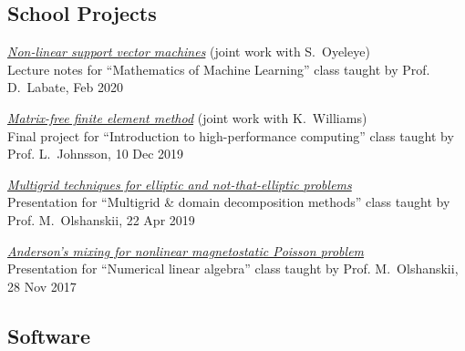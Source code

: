 \documentclass[a4paper,12pt]{article}
\begin{document}
	\subsection*{School Projects}
	
	\begin{etaremune}[topsep=0pt]
		\item \textit{\href{https://www.math.uh.edu/~dlabate/LectureNote_03.pdf}{Non-linear support vector machines}} (joint work with S.~Oyeleye)\\
		      Lecture notes for ``Mathematics of Machine Learning'' class taught by Prof. D.~Labate, Feb 2020 
		\item \textit{\href{https://www.researchgate.net/publication/338009857_Matrix-free_finite_element_method}{Matrix-free finite element method}} (joint work with K.~Williams)\\ 
		      Final project for ``Introduction to high-performance computing'' class taught by Prof. L.~Johnsson, 10 Dec 2019
		\item \textit{\href{https://www.researchgate.net/publication/338011181_Multigrid_techniques_for_elliptic_and_not-that-elliptic_problems}{Multigrid techniques for elliptic and not-that-elliptic problems}}\\ 
		      Presentation for ``Multigrid \& domain decomposition methods'' class taught by Prof. M.~Olshanskii, 22 Apr 2019
		\item \textit{\href{https://www.researchgate.net/publication/321334354_Anderson's_mixing_for_nonlinear_magnetostatic_Poisson_problem}{Anderson's mixing for nonlinear magnetostatic Poisson problem}}\\ 
		      Presentation for ``Numerical linear algebra'' class taught by Prof. M.~Olshanskii, 28 Nov 2017
	\end{etaremune}

	\subsection*{Software}
	
\end{document}
